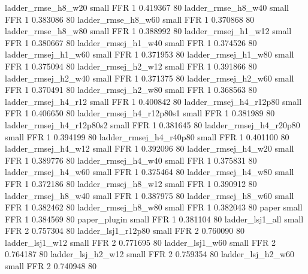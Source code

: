       ladder_rmse_h8_w20      small      FFR                 1 0.419367 80
      ladder_rmse_h8_w40      small      FFR                 1 0.383086 80
      ladder_rmse_h8_w60      small      FFR                 1 0.370868 80
      ladder_rmse_h8_w80      small      FFR                 1 0.388992 80
     ladder_rmsej_h1_w12      small      FFR                 1 0.380667 80
     ladder_rmsej_h1_w40      small      FFR                 1 0.374526 80
     ladder_rmsej_h1_w60      small      FFR                 1 0.371953 80
     ladder_rmsej_h1_w80      small      FFR                 1 0.375094 80
     ladder_rmsej_h2_w12      small      FFR                 1 0.391866 80
     ladder_rmsej_h2_w40      small      FFR                 1 0.371375 80
     ladder_rmsej_h2_w60      small      FFR                 1 0.370491 80
     ladder_rmsej_h2_w80      small      FFR                 1 0.368563 80
     ladder_rmsej_h4_r12      small      FFR                 1 0.400842 80
  ladder_rmsej_h4_r12p80      small      FFR                 1 0.406650 80
ladder_rmsej_h4_r12p80s1      small      FFR                 1 0.381989 80
ladder_rmsej_h4_r12p80s2      small      FFR                 1 0.381645 80
  ladder_rmsej_h4_r20p80      small      FFR                 1 0.394199 80
  ladder_rmsej_h4_r40p80      small      FFR                 1 0.401100 80
     ladder_rmsej_h4_w12      small      FFR                 1 0.392096 80
     ladder_rmsej_h4_w20      small      FFR                 1 0.389776 80
     ladder_rmsej_h4_w40      small      FFR                 1 0.375831 80
     ladder_rmsej_h4_w60      small      FFR                 1 0.375464 80
     ladder_rmsej_h4_w80      small      FFR                 1 0.372186 80
     ladder_rmsej_h8_w12      small      FFR                 1 0.390912 80
     ladder_rmsej_h8_w40      small      FFR                 1 0.387975 80
     ladder_rmsej_h8_w60      small      FFR                 1 0.382462 80
     ladder_rmsej_h8_w80      small      FFR                 1 0.382043 80
                   paper      small      FFR                 1 0.384569 80
            paper_plugin      small      FFR                 1 0.381104 80
         ladder_lsj1_all      small      FFR                 2 0.757304 80
      ladder_lsj1_r12p80      small      FFR                 2 0.760090 80
         ladder_lsj1_w12      small      FFR                 2 0.771695 80
         ladder_lsj1_w60      small      FFR                 2 0.764187 80
       ladder_lsj_h2_w12      small      FFR                 2 0.759354 80
       ladder_lsj_h2_w60      small      FFR                 2 0.740948 80
